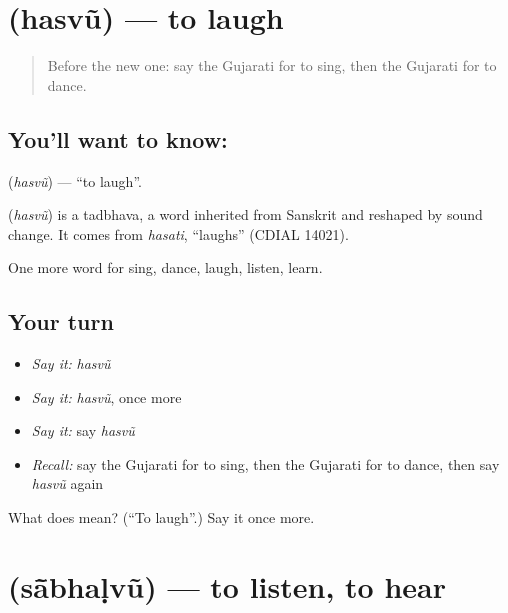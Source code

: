 \section[\texorpdfstring{\gu{હસવું} (hasvũ)}{હસવું (hasvũ)}]{ (hasvũ) — to laugh}

\label{lesson:GU-C56-hasvu}



\begin{quote}
Before the new one: say the Gujarati for to sing, then the Gujarati for to dance.
\end{quote}

\subsection*{You'll want to know: }
\textbf{} (\emph{hasvũ}) — \textquotedblleft{}to laugh\textquotedblright{}.

\begin{cousinweb}
\textbf{} (\emph{hasvũ}) is a tadbhava, a word inherited from Sanskrit and reshaped by sound change. It comes from \emph{hasati}, \textquotedblleft{}laughs\textquotedblright{} (CDIAL 14021).
\end{cousinweb}

\begin{grammarlens}[title={What you've built}]
One more word for sing, dance, laugh, listen, learn.
\end{grammarlens}

\subsection*{Your turn}
\begin{itemize}
\raggedright
  \item \emph{Say it:} \emph{hasvũ}
  \item \emph{Say it:} \emph{hasvũ}, once more
  \item \emph{Say it:} say \emph{hasvũ}
  \item \emph{Recall:} say the Gujarati for to sing, then the Gujarati for to dance, then say \emph{hasvũ} again
\end{itemize}

\begin{tcolorbox}[breakable,colback=teal!4,colframe=teal!35!black,title={Before you move on}]
What does  mean? (\textquotedblleft{}To laugh\textquotedblright{}.) Say it once more.
\end{tcolorbox}
\section[\texorpdfstring{\gu{સાંભળવું} (sā̃bhaḷvũ)}{સાંભળવું (sā̃bhaḷvũ)}]{ (sā̃bhaḷvũ) — to listen, to hear}

